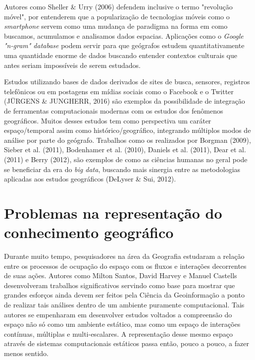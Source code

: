 Autores como Sheller \& Urry (2006)\cite{SHELLER_URRY} defendem inclusive o termo "revolução móvel", por entenderem que a popularização de tecnologias móveis como o \textit{smartphone} servem como uma mudança de paradigma na forma em como buscamos, acumulamos e analisamos dados espacias. Aplicações como o \textit{Google "n-gram" database} podem servir para que geógrafos estudem quantitativamente uma quantidade enorme de dados buscando entender contextos culturais que antes seriam impossíveis de serem estudados.

Estudos utilizando bases de dados derivados de sites de busca, sensores, registros telefônicos ou em postagens em mídias sociais como o Facebook e o Twitter (JÜRGENS \& JUNGHERR, 2016)\cite{JURGENS_JUNGHERR} são exemplos da possibilidade de integração de ferramentas computacionais modernas com os estudos dos fenômenos geográficos. Muitos desses estudos tem como perspectiva um caráter espaço/temporal assim como histórico/geográfico, integrando múltiplos modos de análise por parte do geógrafo. Trabalhos como os realizados por Borgman (2009), Sieber et al. (2011)\cite{SIEBER_etal11}, Bodenhamer et al. (2010)\cite{BODENHAMER_etal10}, Daniels et al. (2011)\cite{DANIELS_etal11}, Dear et al. (2011)\cite{DEAR_etal11} e Berry (2012)\cite{BERRY}, são exemplos de como as ciências humanas no geral pode se beneficiar da era do \textit{big data}, buscando mais sinergia entre as metodologias aplicadas aos estudos geográficos (DeLyser \& Sui, 2012)\cite{DELYSER_SUI_12}.

\section{Problemas na representação do conhecimento geográfico}

Durante muito tempo, pesquisadores na área da Geografia estudaram a relação entre os processos de ocupação do espaço com os fluxos e interações decorrentes de suas ações. Autores como Milton Santos, David Harvey e Manuel Castells desenvolveram trabalhos significativos servindo como base para mostrar que grandes esforços ainda devem ser feitos pela Ciência da Geoinformação a ponto de realizar tais análises dentro de um ambiente puramente computacional. Tais autores se empenharam em desenvolver estudos voltados a compreensão do espaço não só como um ambiente estático, mas como um espaço de interações contínuas, múltiplas e multi-escalares. A representação desse mesmo espaço através de sistemas computacionais estáticos passa então, pouco a pouco, a fazer menos sentido. 

